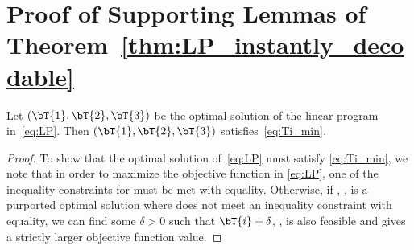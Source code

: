 \section{Proof of Supporting Lemmas of Theorem~\ref{thm:LP_instantly_decodable}}


\begin{myLemma}
\label{lem:LPToMin}
	Let $(\bT{1}, \bT{2}, \bT{3})$ be the optimal solution of the linear program in~\eqref{eq:LP}.  Then $(\bT{1}, \bT{2}, \bT{3})$ satisfies~\eqref{eq:Ti_min}.
\end{myLemma}
\begin{proof}
To show that the optimal solution of~\eqref{eq:LP} must satisfy \eqref{eq:Ti_min}, we note that in order to maximize the objective function in \eqref{eq:LP}, one of the inequality constraints for  must be met with equality.  Otherwise, if , ,  is a purported optimal solution where  does not meet an inequality constraint with equality, we can find some $\delta > 0$ such that $\bT{i} + \delta$, ,  is also feasible and gives a strictly larger objective function value.
\end{proof}


